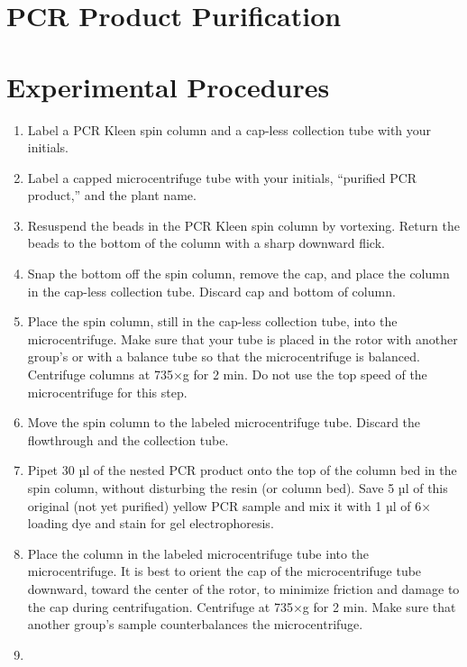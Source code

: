 \documentclass[]{book}
\providecommand{\tightlist}{%
  \setlength{\itemsep}{0pt}\setlength{\parskip}{0pt}}
\theoremstyle{definition}
\theoremstyle{definition}
\theoremstyle{definition}
\theoremstyle{remark}
\begin{document}
\section{PCR Product Purification}\label{pcr-product-purification}

\section{Experimental Procedures}\label{experimental-procedures-13}

\begin{enumerate}
\def\labelenumi{\arabic{enumi}.}
\tightlist
\item
  Label a PCR Kleen spin column and a cap-less collection tube with your
  initials.
\item
  Label a capped microcentrifuge tube with your initials, ``purified PCR
  product,'' and the plant name.
\item
  Resuspend the beads in the PCR Kleen spin column by vortexing. Return
  the beads to the bottom of the column with a sharp downward flick.
\item
  Snap the bottom off the spin column, remove the cap, and place the
  column in the cap-less collection tube. Discard cap and bottom of
  column.
\item
  Place the spin column, still in the cap-less collection tube, into the
  microcentrifuge. Make sure that your tube is placed in the rotor with
  another group's or with a balance tube so that the microcentrifuge is
  balanced. Centrifuge columns at 735×g for 2 min. Do not use the top
  speed of the microcentrifuge for this step.
\item
  Move the spin column to the labeled microcentrifuge tube. Discard the
  flowthrough and the collection tube.
\item
  Pipet 30 µl of the nested PCR product onto the top of the column bed
  in the spin column, without disturbing the resin (or column bed). Save
  5 µl of this original (not yet purified) yellow PCR sample and mix it
  with 1 µl of 6× loading dye and stain for gel electrophoresis.
\item
  Place the column in the labeled microcentrifuge tube into the
  microcentrifuge. It is best to orient the cap of the microcentrifuge
  tube downward, toward the center of the rotor, to minimize friction
  and damage to the cap during centrifugation. Centrifuge at 735×g for 2
  min. Make sure that another group's sample counterbalances the
  microcentrifuge.
\item

\end{enumerate}
\end{document}
